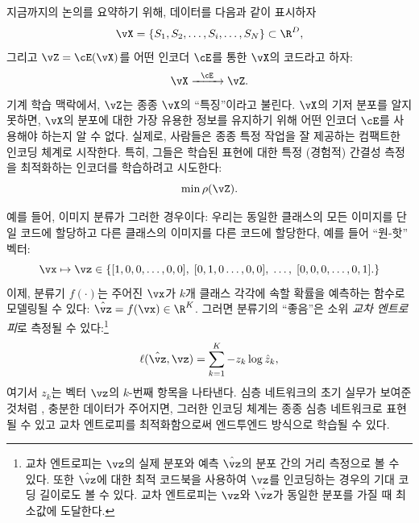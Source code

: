 \documentclass[../../book-main_ko.tex]{subfiles}
\begin{document}
지금까지의 논의를 요약하기 위해, 데이터를 다음과 같이 표시하자
\begin{equation}
    \vX = \{S_{1}, S_{2}, \ldots, S_{i}, \ldots, S_{N}\} \subset \R^{D},
\end{equation}
그리고 \(\vZ = \cE(\vX)\)를 어떤 인코더 \(\cE\)를 통한 \(\vX\)의 코드라고 하자:
\begin{equation}
    \vX  \xrightarrow{\hspace{2mm} \cE\hspace{2mm}} \vZ.
    \label{eqn:open-loop}
\end{equation}
기계 학습 맥락에서, \(\vZ\)는 종종 \(\vX\)의 ``특징''이라고 불린다. \(\vX\)의 기저 분포를 알지 못하면, \(\vX\)의 분포에 대한 가장 유용한 정보를 유지하기 위해 어떤 인코더 \(\cE\)를 사용해야 하는지 알 수 없다. 실제로, 사람들은 종종 특정 작업을 잘 제공하는 컴팩트한 인코딩 체계로 시작한다. 특히, 그들은 학습된 표현에 대한 특정 (경험적) 간결성 측정을 최적화하는 인코더를 학습하려고 시도한다:
\begin{equation}
    \min \rho(\vZ).
\end{equation}

\begin{example}\label{example:image_classification_feature_learning}
    예를 들어, 이미지 분류가 그러한 경우이다: 우리는 동일한 클래스의 모든 이미지를 단일 코드에 할당하고 다른 클래스의 이미지를 다른 코드에 할당한다, 예를 들어 ``원-핫'' 벡터:
    \begin{equation}
        \vx \mapsto \vz \in \{  [1, 0, 0, \ldots , 0, 0], \;  [0, 1, 0 \ldots, 0, 0], \; \ldots, \;  [0,0,0, \ldots, 0, 1].\}
        \label{eqn:class-labels}
    \end{equation}
    이제, 분류기 \(f(\cdot)\)는 주어진 \(\vx\)가 \(k\)개 클래스 각각에 속할 확률을 예측하는 함수로 모델링될 수 있다: \(\hat{\vz} = f(\vx) \in \R^{K}\). 그러면 분류기의 ``좋음''은 소위 {\em 교차 엔트로피}로 측정될 수 있다:\footnote{교차 엔트로피는 \(\vz\)의 실제 분포와 예측 \(\hat{\vz}\)의 분포 간의 거리 측정으로 볼 수 있다. 또한 \(\hat{\vz}\)에 대한 최적 코드북을 사용하여 \(\vz\)를 인코딩하는 경우의 기대 코딩 길이로도 볼 수 있다. 교차 엔트로피는 \(\vz\)와 \(\hat{\vz}\)가 동일한 분포를 가질 때 최소값에 도달한다.}
    \begin{equation}
        \ell(\hat{\vz}, \vz) = \sum_{k=1}^{K} - z_{k} \log \hat{z}_{k},
    \end{equation}
    여기서 \(z_{k}\)는 벡터 \(\vz\)의 \(k\)-번째 항목을 나타낸다. 심층 네트워크의 초기 실무가 보여준 것처럼 \cite{krizhevsky2012imagenet}, 충분한 데이터가 주어지면, 그러한 인코딩 체계는 종종 심층 네트워크로 표현될 수 있고 교차 엔트로피를 최적화함으로써 엔드투엔드 방식으로 학습될 수 있다.
\end{example}
\end{document}
